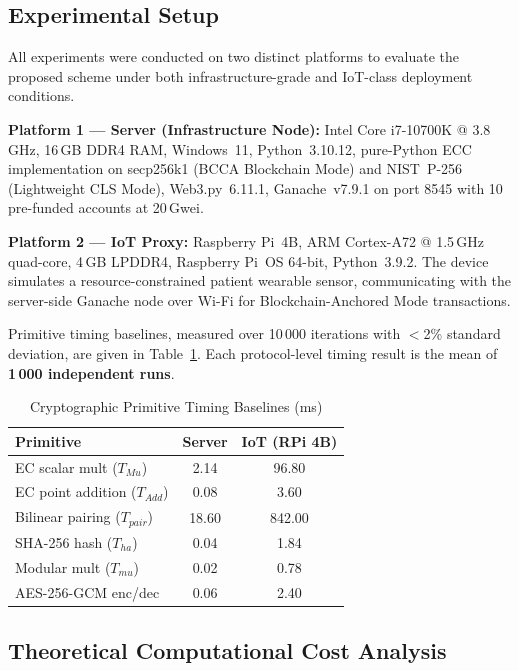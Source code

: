 \documentclass[conference]{IEEEtran}
\begin{document}
\subsection{Experimental Setup}

All experiments were conducted on two distinct platforms to evaluate the
proposed scheme under both infrastructure-grade and IoT-class deployment
conditions.

\textbf{Platform 1 — Server (Infrastructure Node):} Intel Core i7-10700K
@ 3.8\,GHz, 16\,GB DDR4 RAM, Windows~11, Python~3.10.12, pure-Python
ECC implementation on secp256k1 (BCCA Blockchain Mode) and NIST~P-256
(Lightweight CLS Mode), Web3.py~6.11.1, Ganache~v7.9.1 on port 8545
with 10 pre-funded accounts at 20\,Gwei.

\textbf{Platform 2 — IoT Proxy:} Raspberry Pi~4B, ARM Cortex-A72 @
1.5\,GHz quad-core, 4\,GB LPDDR4, Raspberry Pi~OS 64-bit, Python~3.9.2.
The device simulates a resource-constrained patient wearable sensor,
communicating with the server-side Ganache node over Wi-Fi for
Blockchain-Anchored Mode transactions.

Primitive timing baselines, measured over 10\,000 iterations with
$<$2\% standard deviation, are given in Table~\ref{tab:primitives}.
Each protocol-level timing result is the mean of \textbf{1\,000
independent runs}.

\begin{table}[htbp]
\centering
\caption{Cryptographic Primitive Timing Baselines (ms)}
\label{tab:primitives}
\renewcommand{\arraystretch}{1.2}
\begin{tabular}{lcc}
\toprule
\textbf{Primitive} & \textbf{Server} & \textbf{IoT (RPi 4B)} \\
\midrule
EC scalar mult ($T_{Mu}$)     & 2.14 & 96.80 \\
EC point addition ($T_{Add}$) & 0.08 & 3.60  \\
Bilinear pairing ($T_{pair}$) & 18.60 & 842.00 \\
SHA-256 hash ($T_{ha}$)       & 0.04 & 1.84  \\
Modular mult ($T_{mu}$)       & 0.02 & 0.78  \\
AES-256-GCM enc/dec           & 0.06 & 2.40  \\
\bottomrule
\end{tabular}
\end{table}

\subsection{Theoretical Computational Cost Analysis}
\end{document}
